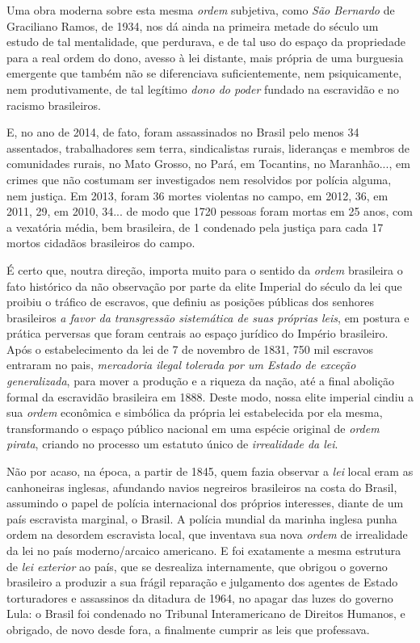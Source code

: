 Uma obra moderna sobre esta mesma \emph{ordem} subjetiva, como \emph{São
Bernardo} de Graciliano Ramos, de 1934, nos dá ainda na primeira metade
do século  um estudo de tal mentalidade, que perdurava, e de tal uso
do espaço da propriedade para a real ordem do dono, avesso à lei
distante, mais própria de uma burguesia emergente que também não se
diferenciava suficientemente, nem psiquicamente, nem produtivamente, de
tal legítimo \emph{dono do poder} fundado na escravidão e no racismo
brasileiros.

E, no ano de 2014, de fato, foram assassinados no Brasil pelo menos 34
assentados, trabalhadores sem terra, sindicalistas rurais, lideranças e
membros de comunidades rurais, no Mato Grosso, no Pará, em Tocantins, no
Maranhão..., em crimes que não costumam ser investigados nem resolvidos
por polícia alguma, nem justiça. Em 2013, foram 36 mortes violentas no
campo, em 2012, 36, em 2011, 29, em 2010, 34... de modo que 1720 pessoas
foram mortas em 25 anos, com a vexatória média, bem brasileira, de 1
condenado pela justiça para cada 17 mortos cidadãos brasileiros do
campo.

É certo que, noutra direção, importa muito para o sentido da
\emph{ordem} brasileira o fato histórico da não observação por parte da
elite Imperial do século  da lei que proibiu o tráfico de escravos,
que definiu as posições públicas dos senhores brasileiros \emph{a favor
da transgressão sistemática de suas próprias leis}, em postura e prática
perversas que foram centrais ao espaço jurídico do Império brasileiro.
Após o estabelecimento da lei de 7 de novembro de 1831, 750 mil escravos
entraram no pais, \emph{mercadoria ilegal tolerada por um Estado de
exceção generalizada}, para mover a produção e a riqueza da nação, até a
final abolição formal da escravidão brasileira em 1888. Deste modo,
nossa elite imperial cindiu a sua \emph{ordem} econômica e simbólica da
própria lei estabelecida por ela mesma, transformando o espaço público
nacional em uma espécie original de \emph{ordem pirata}, criando no
processo um estatuto único de \emph{irrealidade da lei}.

Não por acaso, na época, a partir de 1845, quem fazia observar a
\emph{lei} local eram as canhoneiras inglesas, afundando navios
negreiros brasileiros na costa do Brasil, assumindo o papel de polícia
internacional dos próprios interesses, diante de um país escravista
marginal, o Brasil. A polícia mundial da marinha inglesa punha ordem na
desordem escravista local, que inventava sua nova \emph{ordem} de
irrealidade da lei no país moderno/arcaico americano. E foi exatamente a
mesma estrutura de \emph{lei exterior} ao país, que se desrealiza
internamente, que obrigou o governo brasileiro a produzir a sua frágil
reparação e julgamento dos agentes de Estado torturadores e assassinos
da ditadura de 1964, no apagar das luzes do governo Lula: o Brasil foi
condenado no Tribunal Interamericano de Direitos Humanos, e obrigado, de
novo desde fora, a finalmente cumprir as leis que professava.


